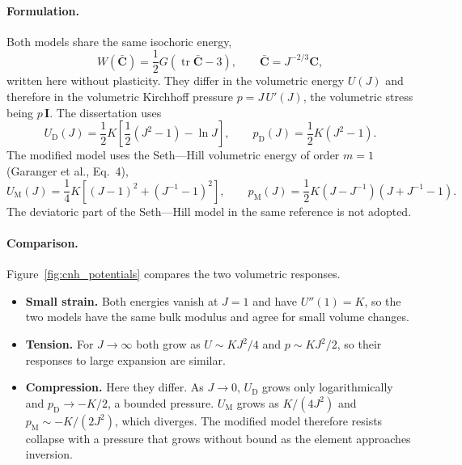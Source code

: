 \paragraph{Formulation.}
Both models share the same isochoric energy,
\begin{equation}
    W(\bar{\mathbf{C}}) = \frac{1}{2}G\left(\operatorname{tr}\bar{\mathbf{C}}-3\right),\qquad \bar{\mathbf{C}} = J^{-2/3}\mathbf{C},
\end{equation}
written here without plasticity. They differ in the volumetric energy $U(J)$ and therefore in the volumetric Kirchhoff pressure $p = J\,U'(J)$, the volumetric stress being $p\,\mathbf{I}$. The dissertation uses
\begin{equation}
    U_\text{D}(J) = \frac{1}{2}K\left[\frac{1}{2}\left(J^2-1\right)-\ln J\right],\qquad p_\text{D}(J) = \frac{1}{2}K\left(J^2-1\right).\label{eq:cnh_vol_borden}
\end{equation}
The modified model uses the Seth---Hill volumetric energy of order $m=1$ (Garanger et al., Eq.~4),
\begin{equation}
    U_\text{M}(J) = \frac{1}{4}K\left[\left(J-1\right)^2+\left(J^{-1}-1\right)^2\right],\qquad p_\text{M}(J) = \frac{1}{2}K\left(J-J^{-1}\right)\left(J+J^{-1}-1\right).\label{eq:cnh_vol_jay}
\end{equation}
The deviatoric part of the Seth---Hill model in the same reference is not adopted.

\paragraph{Comparison.}
Figure~\ref{fig:cnh_potentials} compares the two volumetric responses.
\begin{itemize}
    \item \textbf{Small strain.} Both energies vanish at $J=1$ and have $U''(1)=K$, so the two models have the same bulk modulus and agree for small volume changes.
    \item \textbf{Tension.} For $J\to\infty$ both grow as $U\sim KJ^2/4$ and $p\sim KJ^2/2$, so their responses to large expansion are similar.
    \item \textbf{Compression.} Here they differ. As $J\to0$, $U_\text{D}$ grows only logarithmically and $p_\text{D}\to-K/2$, a bounded pressure. $U_\text{M}$ grows as $K/(4J^2)$ and $p_\text{M}\sim-K/(2J^2)$, which diverges. The modified model therefore resists collapse with a pressure that grows without bound as the element approaches inversion.
\end{itemize}

